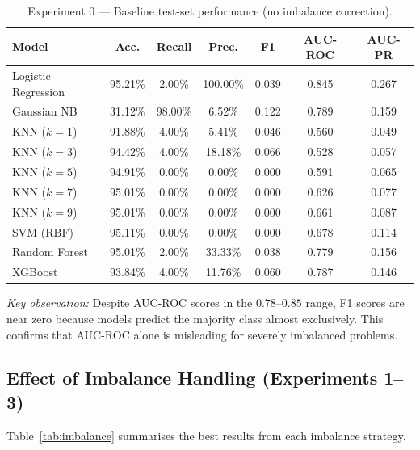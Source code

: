 \documentclass[11pt,a4paper]{article}
\begin{document}
\begin{table}[H]
  \centering
  \caption{Experiment 0 — Baseline test-set performance (no imbalance correction).}
  \label{tab:baseline}
  \renewcommand{\arraystretch}{1.1}
  \begin{tabular}{lcccccc}
    \toprule
    \textbf{Model} & \textbf{Acc.} & \textbf{Recall} & \textbf{Prec.} & \textbf{F1} & \textbf{AUC-ROC} & \textbf{AUC-PR} \\
    \midrule
    Logistic Regression  & 95.21\% & 2.00\%  & 100.00\% & 0.039 & 0.845 & 0.267 \\
    Gaussian NB          & 31.12\% & 98.00\% &   6.52\% & 0.122 & 0.789 & 0.159 \\
    KNN ($k=1$)          & 91.88\% &  4.00\% &   5.41\% & 0.046 & 0.560 & 0.049 \\
    KNN ($k=3$)          & 94.42\% &  4.00\% &  18.18\% & 0.066 & 0.528 & 0.057 \\
    KNN ($k=5$)          & 94.91\% &  0.00\% &   0.00\% & 0.000 & 0.591 & 0.065 \\
    KNN ($k=7$)          & 95.01\% &  0.00\% &   0.00\% & 0.000 & 0.626 & 0.077 \\
    KNN ($k=9$)          & 95.01\% &  0.00\% &   0.00\% & 0.000 & 0.661 & 0.087 \\
    SVM (RBF)            & 95.11\% &  0.00\% &   0.00\% & 0.000 & 0.678 & 0.114 \\
    Random Forest        & 95.01\% &  2.00\% &  33.33\% & 0.038 & 0.779 & 0.156 \\
    XGBoost              & 93.84\% &  4.00\% &  11.76\% & 0.060 & 0.787 & 0.146 \\
    \bottomrule
  \end{tabular}
\end{table}

\noindent\textit{Key observation:} Despite AUC-ROC scores in the $0.78$–$0.85$ range, F1 scores are near zero because models predict the majority class almost exclusively.
This confirms that AUC-ROC alone is misleading for severely imbalanced problems.

\subsection{Effect of Imbalance Handling (Experiments 1–3)}

Table~\ref{tab:imbalance} summarises the best results from each imbalance strategy.
\end{document}

